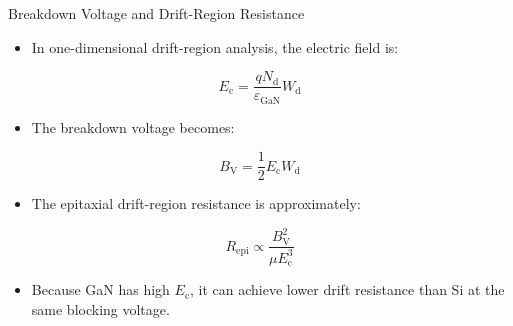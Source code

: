 \begin{frame}{Breakdown Voltage and Drift-Region Resistance}

\begin{itemize}
    \item In one-dimensional drift-region analysis, the electric field is:
\end{itemize}

\begin{equation}
E_{\mathrm{c}}
=
\frac{qN_{\mathrm{d}}}{\varepsilon_{\mathrm{GaN}}}
W_{\mathrm{d}}
\end{equation}

\begin{itemize}
    \item The breakdown voltage becomes:
\end{itemize}

\begin{equation}
B_{\mathrm{V}}
=
\frac{1}{2}E_{\mathrm{c}}W_{\mathrm{d}}
\end{equation}

\begin{itemize}
    \item The epitaxial drift-region resistance is approximately:
\end{itemize}

\begin{equation}
R_{\mathrm{epi}}
\propto
\frac{B_{\mathrm{V}}^{2}}
{\mu E_{\mathrm{c}}^{3}}
\end{equation}

\begin{itemize}
    \item Because GaN has high $E_{\mathrm{c}}$, it can achieve lower drift resistance than Si at the same blocking voltage.
\end{itemize}


\end{frame}


